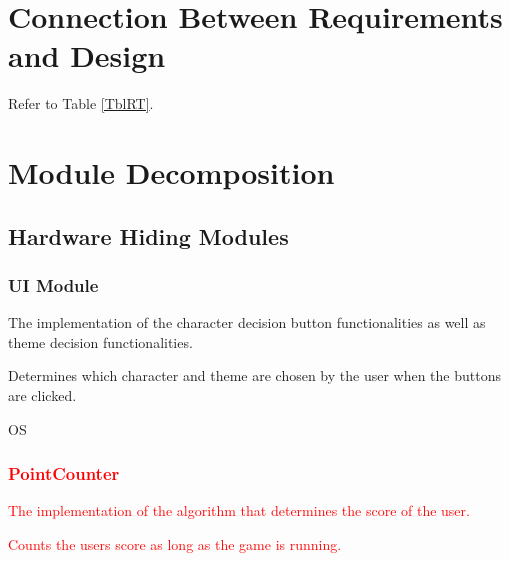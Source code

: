 \documentclass[12pt, titlepage]{article}
\begin{document}
\section{Connection Between Requirements and Design} \label{SecConnection}
Refer to Table \ref{TblRT}.


\section{Module Decomposition} \label{SecMD}

\subsection{Hardware Hiding Modules}

\begin{description}
\subsubsection{UI Module }
\item[Secrets:] The implementation of the character decision button functionalities as well as theme decision functionalities.
\item[Services:] Determines which character and theme are chosen by the user when the buttons are clicked.
\item[Implemented By:] OS

\textcolor{red}{\subsubsection{PointCounter}}
\textcolor{red}{\item[Secrets:] The implementation of the algorithm that determines the score of the user.}
\textcolor{red}{\item[Services:] Counts the users score as long as the game is running.} 


\end{description}
\end{document}
